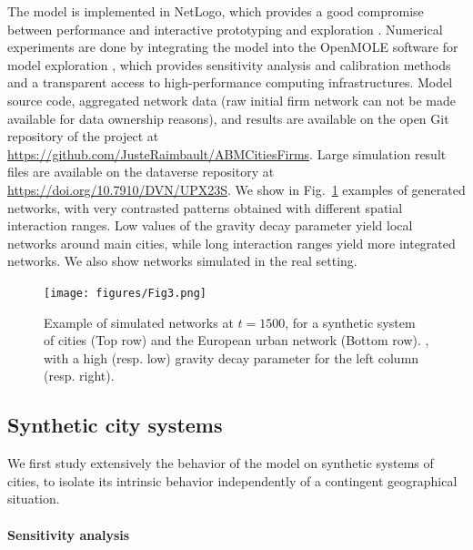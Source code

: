 \documentclass[10pt,letterpaper]{article}
\begin{document}
The model is implemented in NetLogo, which provides a good compromise between performance and interactive prototyping and exploration \cite{railsback2017improving}. Numerical experiments are done by integrating the model into the OpenMOLE software for model exploration \cite{reuillon2013openmole}, which provides sensitivity analysis and calibration methods and a transparent access to high-performance computing infrastructures. Model source code, aggregated network data (raw initial firm network can not be made available for data ownership reasons), and results are available on the open Git repository of the project at \url{https://github.com/JusteRaimbault/ABMCitiesFirms}. Large simulation result files are available on the dataverse repository at \url{https://doi.org/10.7910/DVN/UPX23S}. We show in Fig.~\ref{fig:fig3} examples of generated networks, with very contrasted patterns obtained with different spatial interaction ranges. Low values of the gravity decay parameter yield local networks around main cities, while long interaction ranges yield more integrated networks. We also show networks simulated in the real setting.

\begin{figure}
    \begin{center}
        \texttt{[image: figures/Fig3.png]}
    \end{center}
    \caption{Example of simulated networks at $t=1500$, for a synthetic system of cities (Top row) and the European urban network (Bottom row). , with a high (resp. low) gravity decay parameter for the left column (resp. right).\label{fig:fig3}}
\end{figure}


\subsection*{Synthetic city systems}

We first study extensively the behavior of the model on synthetic systems of cities, to isolate its intrinsic behavior independently of a contingent geographical situation.

\paragraph{Sensitivity analysis}
\end{document}
